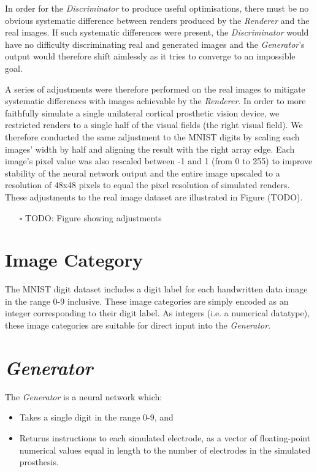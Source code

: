 \documentclass[a4paper,11pt,openany]{book}
\begin{document}
In order for the \emph{Discriminator} to produce useful optimisations, there must be no obvious systematic difference between renders produced by the \emph{Renderer} and the real images.
If such systematic differences were present, the \emph{Discriminator} would have no difficulty discriminating real and generated images and the \emph{Generator}'s output would therefore shift aimlessly as it tries to converge to an impossible goal.

A series of adjustments were therefore performed on the real images to mitigate systematic differences with images achievable by the \emph{Renderer}.
In order to more faithfully simulate a single unilateral cortical prosthetic vision device, we restricted renders to a single half of the visual fields (the right visual field).
We therefore conducted the same adjustment to the MNIST digits by scaling each images' width by half and aligning the result with the right array edge.
Each image's pixel value was also rescaled between -1 and 1 (from 0 to 255) to improve stability of the neural network output and the entire image upscaled to a resolution of 48x48 pixels to equal the pixel resolution of simulated renders.
These adjustments to the real image dataset are illustrated in Figure (TODO).

\begin{itemize}
\item[{$\square$}] TODO: Figure showing adjustments
\end{itemize}

\section*{Image Category}
\label{sec:orgc8a55a9}

The MNIST digit dataset includes a digit label for each handwritten data image in the range 0-9 inclusive.
These image categories are simply encoded as an integer corresponding to their digit label.
As integers (i.e. a numerical datatype), these image categories are suitable for direct input into the \emph{Generator}.

\section*{\emph{Generator}}
\label{sec:orgae2b7e3}

The \emph{Generator} is a neural network which:

\begin{itemize}
\item Takes a single digit in the range 0-9, and
\item Returns instructions to each simulated electrode, as a vector of floating-point numerical values equal in length to the number of electrodes in the simulated prosthesis.
\end{itemize}
\end{document}
